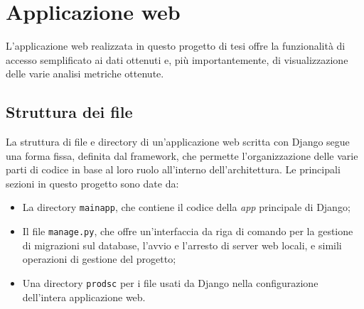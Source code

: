 
\section{Applicazione web}

L'applicazione web realizzata in questo progetto di tesi offre la funzionalità
di accesso semplificato ai dati ottenuti e, più importantemente, di visualizzazione
delle varie analisi metriche ottenute.

\subsection{Struttura dei file}


La struttura di file e directory di un'applicazione web scritta con Django 
segue una forma fissa, definita dal framework, che permette l'organizzazione
delle varie parti di codice in base al loro ruolo all'interno dell'architettura.
Le principali sezioni in questo progetto sono date da:
\begin{itemize}
  \item La directory \texttt{mainapp}, che contiene il codice della \textit{app}
        principale di Django;
  \item Il file \texttt{manage.py}, che offre un'interfaccia da riga di comando
        per la gestione di migrazioni sul database, l'avvio e l'arresto di server
        web locali, e simili operazioni di gestione del progetto;
  \item Una directory \texttt{prodsc} per i file usati da Django nella configurazione
        dell'intera applicazione web.
\end{itemize}

